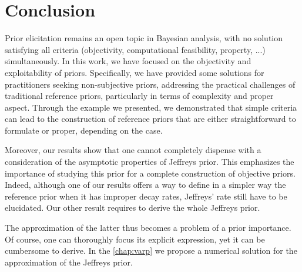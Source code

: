  
 











\section{Conclusion}\label{sec:BA:conclusion}



Prior elicitation remains an open topic in Bayesian analysis, with no solution satisfying all criteria (objectivity, computational feasibility, property, ...) simultaneously. 
In this work, we have focused on the objectivity and exploitability of priors.
Specifically, we have provided some solutions for practitioners seeking non-subjective priors, addressing the practical challenges of traditional reference priors, particularly in terms of complexity and proper aspect. Through the example we presented, we demonstrated that simple criteria can lead to the construction of reference priors that are either straightforward to formulate or proper, depending on the case.

Moreover, our results show that one cannot completely dispense with a consideration of the asymptotic properties of Jeffreys prior. This emphasizes the importance of studying this prior for a complete construction of objective priors.
Indeed, although one of our results  offers a way to define in a simpler way the reference prior when it has improper decay rates, Jeffreys' rate still have to be elucidated. Our other result requires to derive the whole Jeffreys prior.

The approximation of the latter thus becomes a problem of a prior importance. Of course, one can thoroughly focus its explicit expression, yet it can be cumbersome to derive. In the \cref{chap:varp} we propose a numerical solution for the approximation of the Jeffreys prior.















